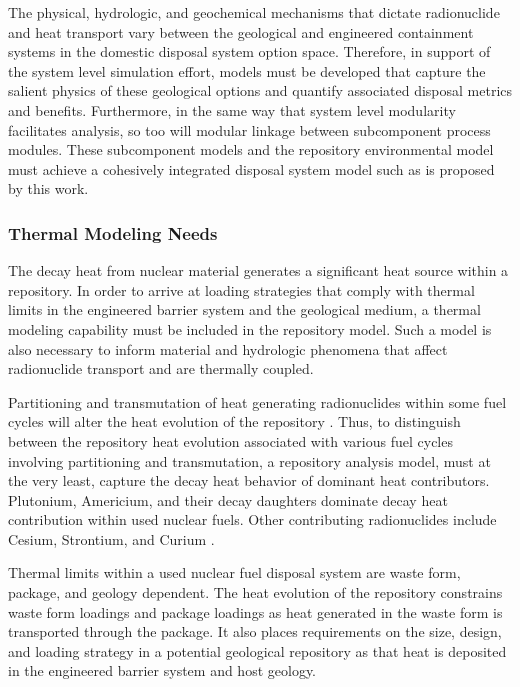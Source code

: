
The physical, hydrologic, and geochemical mechanisms that dictate 
radionuclide and heat transport vary between the geological and engineered 
containment systems in the domestic disposal system option space.  Therefore, 
in support of the system level simulation effort, models must be developed that 
capture the salient physics of these geological options and quantify associated 
disposal metrics and benefits.  Furthermore, in the same way that system level 
modularity facilitates analysis, so too will modular linkage between subcomponent 
process modules. These subcomponent models and the repository environmental model 
must achieve a cohesively integrated disposal system model such as is proposed by 
this work. 


\subsubsection{Thermal Modeling Needs}
The decay heat from nuclear material generates a significant heat source within a 
repository. In order to arrive at loading strategies that comply with thermal 
limits in the engineered barrier system and the geological medium, a thermal 
modeling capability must be included in the repository model. Such a model is 
also necessary to inform material and hydrologic phenomena that affect 
radionuclide transport and are thermally coupled. 

Partitioning and transmutation of heat generating radionuclides within  
some fuel cycles will alter the heat evolution of the repository 
\cite{swift_applying_2010}. Thus, to distinguish  between the repository heat 
evolution associated with various fuel cycles involving partitioning and 
transmutation, a repository analysis model, must at the very least, 
capture the decay heat behavior of dominant heat contributors.  Plutonium, 
Americium, and their decay daughters dominate decay heat contribution within 
used nuclear fuels. Other contributing radionuclides include Cesium, Strontium, 
and Curium \cite{piet_which_2007}. 

Thermal limits within a used nuclear fuel disposal system are waste form, 
package, and geology dependent. The heat evolution of the repository 
constrains waste form loadings and package loadings as heat 
generated in the waste form is transported through the package. It 
also places requirements on the size, design, and loading strategy in a 
potential geological repository as that heat is deposited in the engineered 
barrier system and host geology.

